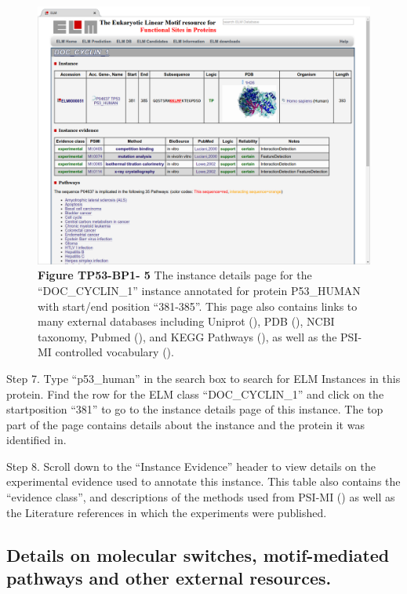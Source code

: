 \begin{figure}[h!]
\centering
\includegraphics[width=\textwidth]{Figures/TP53_1/doc_cyclin_1_instance.png}
\caption{
\textbf{Figure TP53-BP1- 5}
The instance details page for the
``DOC\_CYCLIN\_1'' instance annotated for protein P53\_HUMAN with
start/end position ``381-385''. This page also contains links to many
external databases including Uniprot (\cite{25348405}), PDB
(\cite{12037327}), NCBI taxonomy, Pubmed (\cite{27899561}), and KEGG
Pathways (\cite{26476454}), as well as the PSI-MI controlled vocabulary
(\cite{17925023}).
}
\end{figure}

Step 7. Type ``p53\_human'' in the search box to search for ELM
Instances in this protein. Find the row for the ELM class
``DOC\_CYCLIN\_1'' and click on the startposition ``381'' to go to the
instance details page of this instance. The top part of the page
contains details about the instance and the protein it was identified
in.

Step 8. Scroll down to the ``Instance Evidence'' header to view details
on the experimental evidence used to annotate this instance. This table
also contains the ``evidence class'', and descriptions of the methods
used from PSI-MI (\cite{17925023}) as well as the Literature references
in which the experiments were published.


\subsection{Details on molecular switches, motif-mediated pathways and
other external
resources.}\label{details-on-molecular-switches-motif-mediated-pathways-and-other-external-resources.}

